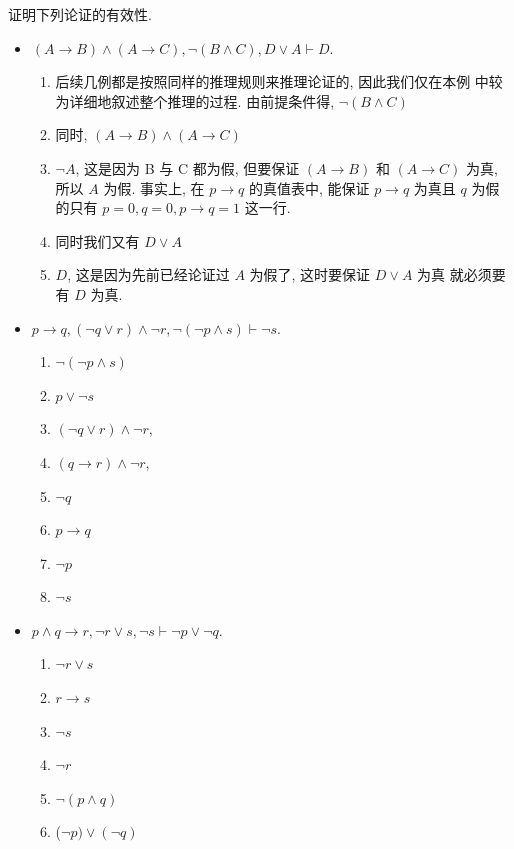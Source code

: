 \documentclass[10pt,UTF8]{ctexbook} %
\begin{document}
\begin{example}
    证明下列论证的有效性.
    \begin{itemize}
        \item $(A \to B)\wedge(A \to C), \lnot (B \wedge C), D 
        \vee A \vdash D$.
        \begin{enumerate}[label={${\arabic*}^\circ$}, itemsep=0pt]
            \item 后续几例都是按照同样的推理规则来推理论证的, 因此我们仅在本例
            中较为详细地叙述整个推理的过程. 由前提条件得, $\lnot (B \wedge C)$
            \item 同时, $(A \to B)\wedge(A \to C)$
            \item $\lnot A$, 这是因为 B 与 C 都为假, 但要保证 $(A \to B)$ 和 $(A \to C)$ 为真, 所以 $A$ 为假. 事实上, 在 $p \to q$ 的真值表中,
            能保证 $p \to q$ 为真且 $q$ 为假的只有 $p=0, q=0, p \to q = 1$ 这一行.
            \item 同时我们又有 $D \vee A$
            \item $D$, 这是因为先前已经论证过 $A$ 为假了, 这时要保证 $D \vee A$ 为真
            就必须要有 $D$ 为真.
        \end{enumerate}
        \item $p \to q, (\lnot q \vee r)\wedge \lnot r, \lnot(\lnot p \wedge s) \vdash \lnot s$.
        \begin{enumerate}[label={${\arabic*}^\circ$}, itemsep=0pt]
            \item $\lnot(\lnot p \wedge s)$
            \item $p \vee \lnot s$
            \item $(\lnot q \vee r)\wedge \lnot r$,
            \item $(q \to r) \wedge \lnot r$,
            \item $\lnot q$
            \item $p \to q$
            \item $\lnot p$
            \item $\lnot s$
        \end{enumerate}
        \item $p \wedge q \to r, \lnot r \vee s, \lnot s \vdash \lnot p \vee \lnot q$.
        \begin{enumerate}[label={${\arabic*}^\circ$}, itemsep=0pt]
            \item $\lnot r \vee s$
            \item $r \to s$
            \item $\lnot s$
            \item $\lnot r$
            \item $\lnot (p \wedge q)$
            \item ($\lnot p) \vee (\lnot q)$
        \end{enumerate}
    \end{itemize}
\end{example}
\end{document}
